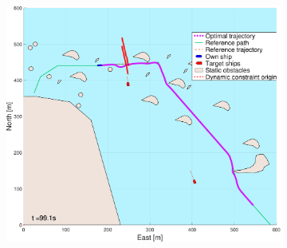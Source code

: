 \begin{figure}[!ht]
\begin{subfigure}[b]{0.494\textwidth}
        \includegraphics[width=\textwidth]{Images/NewFigures/skjergard_m_trafikk_NEW/_Simple_0fig999_time=100}
        \subcaption{}
    \end{subfigure}
    \hfill
    \label{FIG: Skjaergard with traffic and full pred}
\end{figure}%
